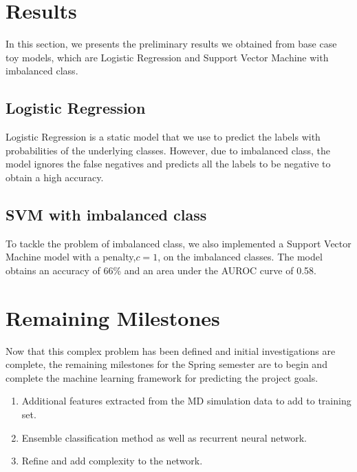 \section{Results}
In this section, we presents the preliminary results we obtained from base case toy models, which are Logistic Regression and Support Vector Machine with imbalanced class.

\subsection{Logistic Regression}
Logistic Regression is a static model that we use to predict the labels with probabilities of the underlying classes. However, due to imbalanced class, the model ignores the false negatives and predicts all the labels to be negative to obtain a high accuracy. 

\subsection{SVM with imbalanced class}
To tackle the problem of imbalanced class, we also implemented a Support Vector Machine model with a penalty,$c=1$, on the imbalanced classes. The model obtains an accuracy of 66\% and an area under the AUROC curve of 0.58.


\section{Remaining Milestones}
Now that this complex problem has been defined and initial investigations are complete, the remaining milestones for the Spring semester are to begin and complete the machine learning framework for predicting the project goals. 

\begin{enumerate}
\item Additional features extracted from the MD simulation data to add to training set.
\item Ensemble classification method as well as recurrent neural network.
\item Refine and add complexity to the network.
\end{enumerate}


